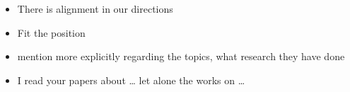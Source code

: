 \todo{}

\begin{itemize}
	\item There is alignment in our directions
	\item Fit the position
\end{itemize}

\begin{itemize}
	\item mention more explicitly regarding the topics, what research they have done
	\item I read your papers about … let alone the works on …
\end{itemize}
